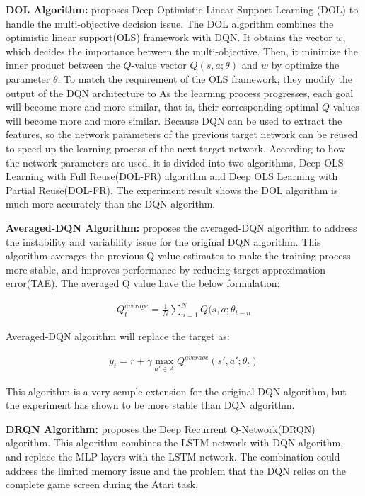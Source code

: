 \documentclass{article}
\begin{document}
{\bf DOL Algorithm:}
\citep{mossalam2016multi} proposes Deep Optimistic Linear Support Learning (DOL) to handle the multi-objective decision issue. The DOL algorithm combines the optimistic linear support(OLS) \citep{roijers2015computing} framework with DQN. It obtains the vector $w$, which decides the importance between the multi-objective. Then, it minimize the inner product between the $Q$-value vector $Q(s,a;\theta)$ and $w$ by optimize the parameter $\theta$. To match the requirement of the OLS framework, they modify the output of the DQN architecture to %
As the learning process progresses, each goal will become more and more similar, that is, their corresponding optimal $Q$-values will become more and more similar. Because DQN can be used to extract the features, so the network parameters of the previous target network can be reused to speed up the learning process of the next target network. According to how the network parameters are used, it is divided into two algorithms, Deep OLS Learning with Full Reuse(DOL-FR) algorithm and Deep OLS Learning with Partial Reuse(DOL-FR). The experiment result shows the DOL algorithm is much more accurately than the DQN algorithm.

{\bf Averaged-DQN Algorithm:}
\citep{anschel2017averaged} proposes the averaged-DQN algorithm to address the instability and variability issue for the original DQN algorithm. This algorithm averages the previous Q value estimates to make the training process more stable, and improves performance by reducing target approximation error(TAE). The averaged Q value have the below formulation:

\begin{align}
Q_{t}^{average}=\frac{1}{N}\sum_{n=1}^N{Q(s,a;\theta_{t-n}}
\end{align}

Averaged-DQN algorithm will replace the target as:

\begin{align}
y_t= r +\gamma \operatorname*{max}_{a' \in  A} Q^{average}(s',a';\theta_{t})
\end{align}

This algorithm is a very semple extension for the original DQN algorithm, but the experiment has shown to be more stable than DQN algorithm.

{\bf DRQN Algorithm:}
\citep{hausknecht2015deep} proposes the Deep Recurrent Q-Network(DRQN) algorithm. This algorithm combines the LSTM network with DQN algorithm, and replace the MLP layers with the LSTM network. The combination could address the limited memory issue and the problem that the DQN relies on the complete game screen during the Atari task.
\end{document}
